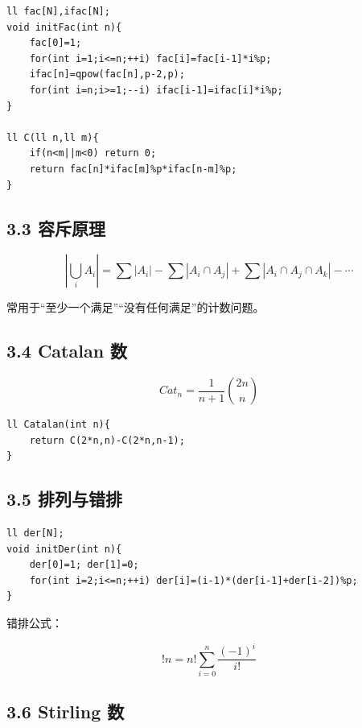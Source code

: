 \documentclass[UTF8,a4paper,11pt]{ctexart}
\begin{document}
\begin{Verbatim}[fontsize=\small,frame=single,breaklines=true,breakanywhere=true]
ll fac[N],ifac[N];
void initFac(int n){
    fac[0]=1;
    for(int i=1;i<=n;++i) fac[i]=fac[i-1]*i%p;
    ifac[n]=qpow(fac[n],p-2,p);
    for(int i=n;i>=1;--i) ifac[i-1]=ifac[i]*i%p;
}

ll C(ll n,ll m){
    if(n<m||m<0) return 0;
    return fac[n]*ifac[m]%p*ifac[n-m]%p;
}
\end{Verbatim}

\subsection*{3.3 容斥原理}

\[
\left|\bigcup_i A_i\right|=\sum|A_i|-\sum|A_i\cap A_j|+\sum|A_i\cap A_j\cap A_k|-\cdots
\]

常用于“至少一个满足”“没有任何满足”的计数问题。

\subsection*{3.4 Catalan 数}

\[
Cat_n=\frac{1}{n+1}\binom{2n}{n}
\]

\begin{Verbatim}[fontsize=\small,frame=single,breaklines=true,breakanywhere=true]
ll Catalan(int n){
    return C(2*n,n)-C(2*n,n-1);
}
\end{Verbatim}
\subsection*{3.5 排列与错排}

\begin{Verbatim}[fontsize=\small,frame=single,breaklines=true,breakanywhere=true]
ll der[N];
void initDer(int n){
    der[0]=1; der[1]=0;
    for(int i=2;i<=n;++i) der[i]=(i-1)*(der[i-1]+der[i-2])%p;
}
\end{Verbatim}

错排公式：

\[
!n=n!\sum_{i=0}^{n}\frac{(-1)^i}{i!}
\]

\subsection*{3.6 Stirling 数}
\end{document}
